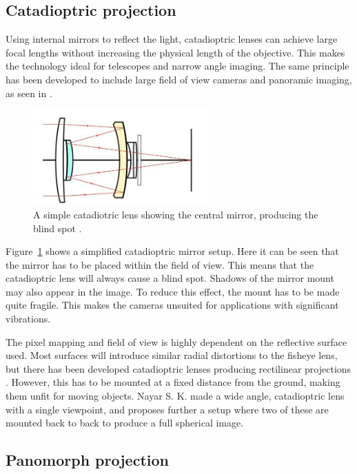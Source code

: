 \subsection{Catadioptric projection}

Using internal mirrors to reflect the light, catadioptric lenses can achieve large focal lengths without increasing the physical length of the objective. This makes the technology ideal for telescopes and narrow angle imaging. The same principle has been developed to include large field of view cameras and panoramic imaging, as seen in \cite{CatadioptricOmni}. 

\begin{figure}[!htb]
    \centering
    \includegraphics[width=0.6\textwidth]{rapport/fig/Theory/cata.jpeg}
    \caption{A simple catadiotric lens showing the central mirror, producing the blind spot \cite{CataImage}.}
    \label{fig:theory_catadioptric_lens}
\end{figure}

Figure~\ref{fig:theory_catadioptric_lens} shows a simplified catadioptric mirror setup. Here it can be seen that the mirror has to be placed within the field of view. This means that the catadioptric lens will always cause a blind spot. Shadows of the mirror mount may also appear in the image. To reduce this effect, the mount has to be made quite fragile. This makes the cameras unsuited for applications with significant vibrations.

The pixel mapping and field of view is highly dependent on the reflective surface used. Most surfaces will introduce similar radial distortions to the fisheye lens, but there has been developed catadioptric lenses producing rectilinear projections \cite{RectilinearCatadioptric}. However, this has to be mounted at a fixed distance from the ground, making them unfit for moving objects. Nayar S. K. made a wide angle, catadioptric lens \cite{CatadioptricOmni} with a single viewpoint, and proposes further a setup where two of these are mounted back to back to produce a full spherical image.

\subsection{Panomorph projection}

